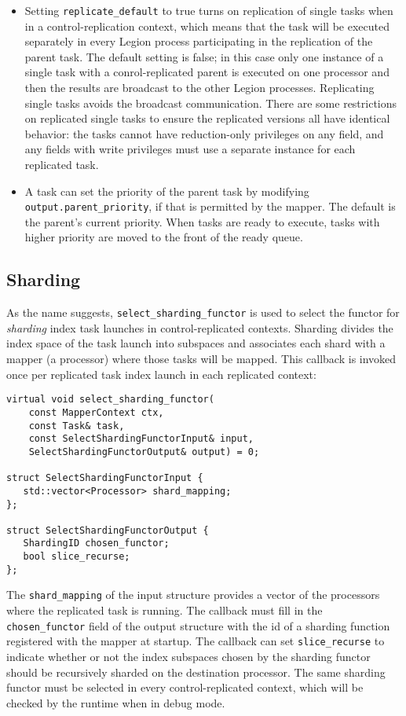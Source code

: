 \begin{itemize}
\item Setting {\tt replicate\_default} to true turns on replication of single tasks when in a control-replication context, which means that the task will be executed separately in every Legion process participating in the replication of the parent task.  The default setting
  is false; in this case only one instance of a single task with a conrol-replicated parent is executed on one processor and then the results are broadcast to the other Legion processes.  Replicating single tasks avoids the broadcast communication.  There are some restrictions on replicated single tasks to ensure the
  replicated versions all have identical behavior: the tasks cannot have reduction-only privileges on any field, and any fields with write privileges must use a separate instance for each replicated task.

\item A task can set the priority of the parent task by modifying {\tt  output.parent\_priority}, if that is permitted by the mapper.  The default is the parent's current priority.  When tasks are ready to execute, tasks with higher priority are moved to the front of the ready queue.
\end{itemize}

\subsection{Sharding}
As the name suggests, {\tt select\_sharding\_functor} is used to select the functor for {\em sharding} index task launches in control-replicated contexts.  Sharding divides the index space of the task launch into subspaces and associates each shard with a mapper (a processor)
where those tasks will be mapped.  This callback is invoked once per replicated task index launch in each replicated context:
\begin{lstlisting}
virtual void select_sharding_functor(
    const MapperContext ctx,
    const Task& task,
    const SelectShardingFunctorInput& input,
    SelectShardingFunctorOutput& output) = 0;

struct SelectShardingFunctorInput {
   std::vector<Processor> shard_mapping;
};

struct SelectShardingFunctorOutput {
   ShardingID chosen_functor;
   bool slice_recurse;
};
\end{lstlisting}
The {\tt shard\_mapping} of the input structure provides a vector of the processors where the replicated task is running.  The callback must fill in the {\tt chosen\_functor} field of the output structure with the id of a sharding function registered with the mapper at
startup.  The callback can set {\tt slice\_recurse} to indicate whether or not the index subspaces chosen by the sharding functor should be recursively sharded on the destination processor.  The same sharding functor must be selected in every control-replicated context, which
will be checked by the runtime when in debug mode.

